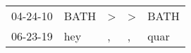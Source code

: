\begin{supertabular}{p{0.07\textwidth}p{0.06\textwidth}p{0.02\textwidth}p{0.02\textwidth}p{0.06\textwidth}}
 04-24-10\textsuperscript{} &  BATH\textsuperscript{} &  \textgreater &  \textgreater &  BATH\textsuperscript{} \\
 06-23-19\textsuperscript{} &   hey\textsuperscript{} &             , &             , &  quar\textsuperscript{} \\
\end{supertabular}
